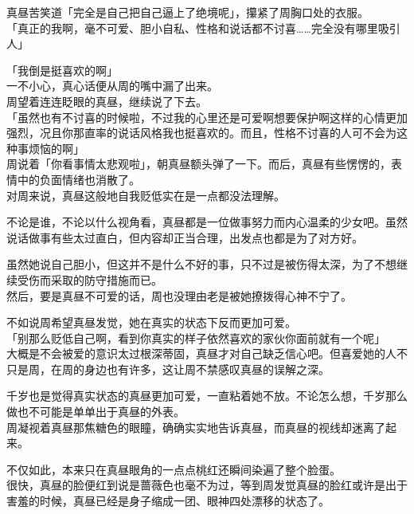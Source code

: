 真昼苦笑道「完全是自己把自己逼上了绝境呢」，攥紧了周胸口处的衣服。\\

「真正的我啊，毫不可爱、胆小自私、性格和说话都不讨喜……完全没有哪里吸引人」

「我倒是挺喜欢的啊」\\

一不小心，真心话便从周的嘴中漏了出来。\\

周望着连连眨眼的真昼，继续说了下去。\\

「虽然也有不讨喜的时候啦，不过我的心里还是可爱啊想要保护啊这样的心情更加强烈，况且你那直率的说话风格我也挺喜欢的。而且，性格不讨喜的人可不会为这种事烦恼的啊」\\

周说着「你看事情太悲观啦」，朝真昼额头弹了一下。而后，真昼有些愣愣的，表情中的负面情绪也消散了。\\

对周来说，真昼这般地自我贬低实在是一点都没法理解。

不论是谁，不论以什么视角看，真昼都是一位做事努力而内心温柔的少女吧。虽然说话做事有些太过直白，但内容却正当合理，出发点也都是为了对方好。

虽然她说自己胆小，但这并不是什么不好的事，只不过是被伤得太深，为了不想继续受伤而采取的防守措施而已。\\

然后，要是真昼不可爱的话，周也没理由老是被她撩拨得心神不宁了。

不如说周希望真昼发觉，她在真实的状态下反而更加可爱。\\

「别那么贬低自己啊，看到你真实的样子依然喜欢的家伙你面前就有一个呢」\\

大概是不会被爱的意识太过根深蒂固，真昼才对自己缺乏信心吧。但喜爱她的人不只是周，在周的身边也有许多，这让周不禁感叹真昼的误解之深。

千岁也是觉得真实状态的真昼更加可爱，一直粘着她不放。不论怎么想，千岁那么做也不可能是单单出于真昼的外表。\\

周凝视着真昼那焦糖色的眼瞳，确确实实地告诉真昼，而真昼的视线却迷离了起来。

不仅如此，本来只在真昼眼角的一点点桃红还瞬间染遍了整个脸蛋。\\

很快，真昼的脸便红到说是蔷薇色也毫不为过，等到周发觉真昼的脸红或许是出于害羞的时候，真昼已经是身子缩成一团、眼神四处漂移的状态了。\\

